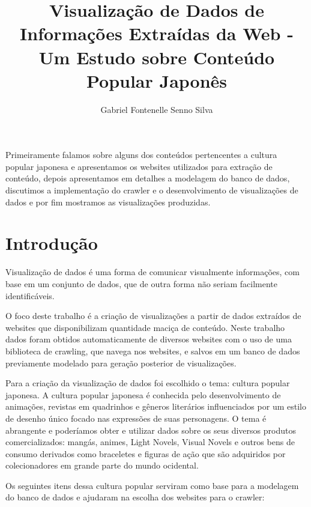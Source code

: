 \documentclass[12pt]{article}
\title{Visualização de Dados de Informações Extraídas da Web - Um Estudo sobre Conteúdo Popular Japonês}
\author{Gabriel Fontenelle Senno Silva\inst{1}}
\begin{document}
 
\maketitle

\begin{resumo} 

Primeiramente falamos sobre alguns dos conteúdos pertencentes a cultura popular japonesa e apresentamos os websites utilizados para extração de conteúdo, depois apresentamos em detalhes a modelagem do banco de dados, discutimos a implementação do crawler e o desenvolvimento de visualizações de dados e por fim mostramos as visualizações produzidas.

\end{resumo}


\section{Introdução}

Visualização de dados é uma forma de comunicar visualmente informações, com base em um conjunto de dados, que de outra forma não seriam facilmente identificáveis.

O foco deste trabalho é a criação de visualizações a partir de dados extraídos de websites que disponibilizam quantidade maciça de conteúdo. Neste trabalho dados foram obtidos automaticamente de diversos websites com o uso de uma biblioteca de crawling, que navega nos websites, e salvos em um banco de dados previamente modelado para geração posterior de visualizações. 


Para a criação da visualização de dados foi escolhido o tema: cultura popular japonesa. A cultura popular japonesa é conhecida pelo desenvolvimento de animações, revistas em quadrinhos e gêneros literários influenciados por um estilo de desenho único focado nas expressões de suas personagens. O tema é abrangente e poderíamos obter e utilizar dados sobre os seus diversos produtos comercializados: mangás, animes, Light Novels, Visual Novels e outros bens de consumo derivados como braceletes e figuras de ação que são adquiridos por colecionadores em grande parte do mundo ocidental.


Os seguintes itens dessa cultura popular serviram como base para a modelagem do banco de dados e ajudaram na escolha dos websites para o crawler:
\end{document}
